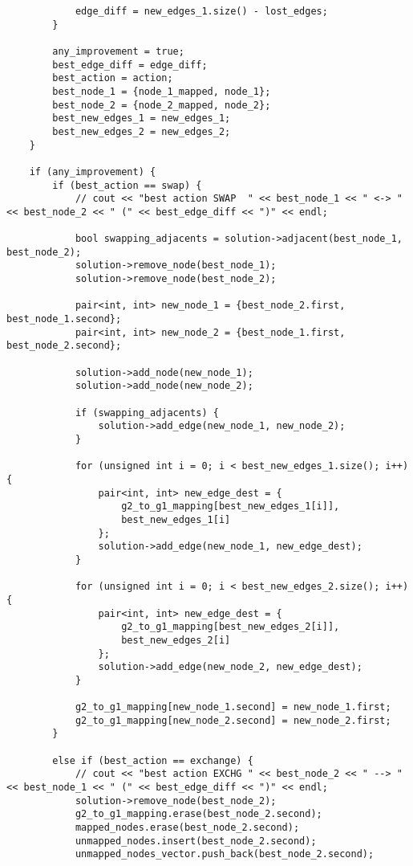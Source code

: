 \begin{lstlisting}
            edge_diff = new_edges_1.size() - lost_edges;
        }

        any_improvement = true;
        best_edge_diff = edge_diff;
        best_action = action;
        best_node_1 = {node_1_mapped, node_1};
        best_node_2 = {node_2_mapped, node_2};
        best_new_edges_1 = new_edges_1;
        best_new_edges_2 = new_edges_2;
    }

    if (any_improvement) {
        if (best_action == swap) {
            // cout << "best action SWAP  " << best_node_1 << " <-> " << best_node_2 << " (" << best_edge_diff << ")" << endl;

            bool swapping_adjacents = solution->adjacent(best_node_1, best_node_2);
            solution->remove_node(best_node_1);
            solution->remove_node(best_node_2);

            pair<int, int> new_node_1 = {best_node_2.first, best_node_1.second};
            pair<int, int> new_node_2 = {best_node_1.first, best_node_2.second};

            solution->add_node(new_node_1);
            solution->add_node(new_node_2);

            if (swapping_adjacents) {
                solution->add_edge(new_node_1, new_node_2);
            }

            for (unsigned int i = 0; i < best_new_edges_1.size(); i++) {
                pair<int, int> new_edge_dest = {
                    g2_to_g1_mapping[best_new_edges_1[i]],
                    best_new_edges_1[i]
                };
                solution->add_edge(new_node_1, new_edge_dest);
            }

            for (unsigned int i = 0; i < best_new_edges_2.size(); i++) {
                pair<int, int> new_edge_dest = {
                    g2_to_g1_mapping[best_new_edges_2[i]],
                    best_new_edges_2[i]
                };
                solution->add_edge(new_node_2, new_edge_dest);
            }

            g2_to_g1_mapping[new_node_1.second] = new_node_1.first;
            g2_to_g1_mapping[new_node_2.second] = new_node_2.first;
        }

        else if (best_action == exchange) {
            // cout << "best action EXCHG " << best_node_2 << " --> " << best_node_1 << " (" << best_edge_diff << ")" << endl;
            solution->remove_node(best_node_2);
            g2_to_g1_mapping.erase(best_node_2.second);
            mapped_nodes.erase(best_node_2.second);
            unmapped_nodes.insert(best_node_2.second);
            unmapped_nodes_vector.push_back(best_node_2.second);


\end{lstlisting}

